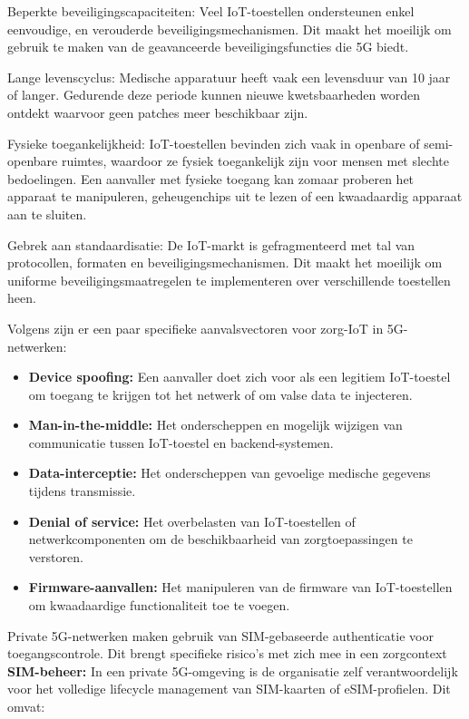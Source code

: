 Beperkte beveiligingscapaciteiten: Veel IoT-toestellen ondersteunen enkel eenvoudige, en verouderde beveiligingsmechanismen. Dit maakt het moeilijk om gebruik te maken van de geavanceerde beveiligingsfuncties die 5G biedt.
\vspace{0.5cm}

Lange levenscyclus: Medische apparatuur heeft vaak een levensduur van 10 jaar of langer. Gedurende deze periode kunnen nieuwe kwetsbaarheden worden ontdekt waarvoor geen patches meer beschikbaar zijn.
\vspace{0.5cm}

Fysieke toegankelijkheid: IoT-toestellen bevinden zich vaak in openbare of semi-openbare ruimtes, waardoor ze fysiek toegankelijk zijn voor mensen met slechte bedoelingen. Een aanvaller met fysieke toegang kan zomaar proberen het apparaat te manipuleren, geheugenchips uit te lezen of een kwaadaardig apparaat aan te sluiten.
\vspace{0.5cm} 

Gebrek aan standaardisatie: De IoT-markt is gefragmenteerd met tal van protocollen, formaten en beveiligingsmechanismen. Dit maakt het moeilijk om uniforme beveiligingsmaatregelen te implementeren over verschillende toestellen heen.
\vspace{0.5cm}

Volgens \autocite{ENISA2022} zijn er een paar specifieke aanvalsvectoren voor zorg-IoT in 5G-netwerken:

\begin{itemize}
	\item \textbf{Device spoofing:} Een aanvaller doet zich voor als een legitiem IoT-toestel om toegang te krijgen tot het netwerk of om valse data te injecteren.
	\item \textbf{Man-in-the-middle:} Het onderscheppen en mogelijk wijzigen van communicatie tussen IoT-toestel en backend-systemen.
	\item \textbf{Data-interceptie:} Het onderscheppen van gevoelige medische gegevens tijdens transmissie.
	\item \textbf{Denial of service:} Het overbelasten van IoT-toestellen of netwerkcomponenten om de beschikbaarheid van zorgtoepassingen te verstoren.
	\item \textbf{Firmware-aanvallen:} Het manipuleren van de firmware van IoT-toestellen om kwaadaardige functionaliteit toe te voegen.
\end{itemize}
\vspace{0.5cm}
Private 5G-netwerken maken gebruik van SIM-gebaseerde authenticatie voor toegangscontrole. Dit brengt specifieke risico's met zich mee in een zorgcontext 
\vspace{0.5cm}
\textbf{SIM-beheer:} In een private 5G-omgeving is de organisatie zelf verantwoordelijk voor het volledige lifecycle management van SIM-kaarten of eSIM-profielen. Dit omvat:

